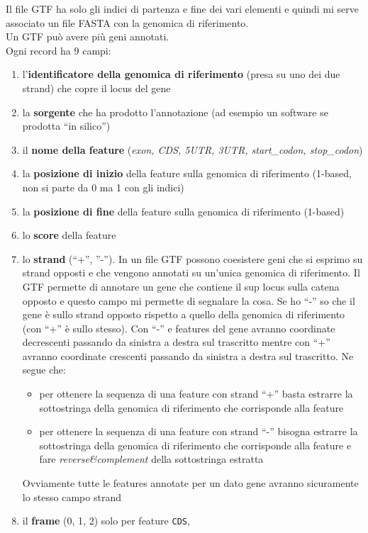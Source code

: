 \documentclass[a4paper,12pt, oneside]{book}
\begin{document}
Il file GTF ha solo gli indici di partenza e fine dei vari elementi e quindi mi
serve associato un file FASTA con la genomica di riferimento.\\
Un GTF può avere più geni annotati.\\
Ogni record ha 9 campi:
\begin{enumerate}
  \item l'\textbf{identificatore della genomica di riferimento} (presa su uno dei
  due strand) che copre il locus del gene
  \item la \textbf{sorgente} che ha prodotto l’annotazione (ad esempio un
  software se prodotta ``in silico'') 
  \item il \textbf{nome della feature} (\textit{exon, CDS, 5UTR, 3UTR,
    start\_codon, stop\_codon}) 
  \item la \textbf{posizione di inizio} della feature sulla genomica di
  riferimento  (1-based, non si parte da 0 ma 1 con gli indici) 
  \item la \textbf{posizione di fine} della feature sulla genomica di
  riferimento (1-based)
  \item lo \textbf{score} della feature
  \item lo \textbf{strand} (``+'', ''-''). In un file GTF possono coesistere
  geni che si 
  esprimo su strand opposti e che vengono annotati su un'unica genomica di
  riferimento. Il GTF permette di annotare un gene che contiene il sup locus
  sulla catena opposto e questo campo mi permette di segnalare la cosa. Se ho
  ``-'' so che il gene è sullo strand opposto rispetto a quello della genomica
  di riferimento (con ``+'' è sullo stesso). Con ``-'' e features del gene
  avranno coordinate decrescenti passando da sinistra a destra sul trascritto
  mentre con ``+'' avranno coordinate crescenti passando da sinistra a destra
  sul trascritto. Ne segue che:
  \begin{itemize}
    \item per ottenere la sequenza di una feature con strand ``+'' basta
    estrarre la sottostringa della genomica di riferimento che corrisponde alla
    feature 
    \item per ottenere la sequenza di una feature con strand ``-'' bisogna
    estrarre la sottostringa della genomica di riferimento che corrisponde alla
    feature e fare \textit{reverse\&complement} della sottostringa estratta
  \end{itemize}
  Ovviamente tutte le features annotate per un dato gene avranno sicuramente lo
  stesso campo strand 
  \item il \textbf{frame} (0, 1, 2) solo per feature \texttt{CDS},

\end{enumerate}
\end{document}
